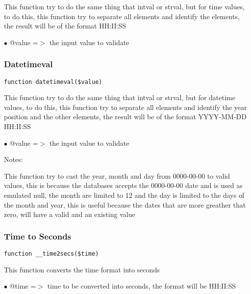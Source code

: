 \documentclass[a4paper]{article}
\begin{document}
This function try to do the same thing that intval or strval, but for time
values, to do this, this function try to separate all elements and identify
the elements, the result will be of the format HH:II:SS

\begin{compactitem}
\item[\color{myblue}$\bullet$] @value =$>$ the input value to validate
\end{compactitem}

\hypertarget{toc105}{}
\subsubsection{Datetimeval}

\begin{lstlisting}
function datetimeval($value)
\end{lstlisting}

This function try to do the same thing that intval or strval, but for datetime
values, to do this, this function try to separate all elements and identify
the year position and the other elements, the result will be of the format
YYYY-MM-DD HH:II:SS

\begin{compactitem}
\item[\color{myblue}$\bullet$] @value =$>$ the input value to validate
\end{compactitem}

Notes:

This function try to cast the year, month and day from 0000-00-00 to valid
values, this is because the databases accepts the 0000-00-00 date and is used
as emulated null, the month are limited to 12 and the day is limited to the
days of the month and year, this is useful because the dates that are more
greather that zero, will have a valid and an existing value

\hypertarget{toc106}{}
\subsubsection{Time to Seconds}

\begin{lstlisting}
function __time2secs($time)
\end{lstlisting}

This function converts the time format into seconds

\begin{compactitem}
\item[\color{myblue}$\bullet$] @time =$>$ time to be converted into seconds, the format will be HH:II:SS
\end{compactitem}
\end{document}
